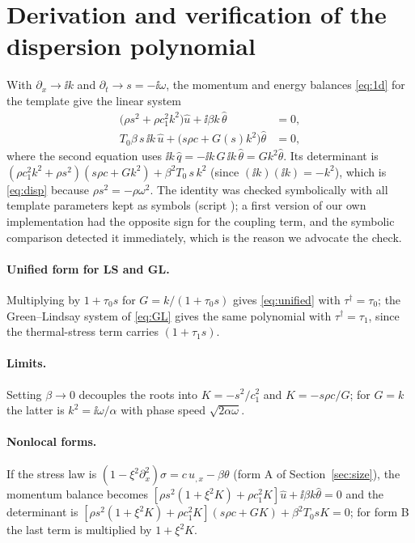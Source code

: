 \section{Derivation and verification of the dispersion polynomial}\label{app:disp}
With $\partial_x\to\ii k$ and $\partial_t\to s=-\ii\omega$, the momentum and energy balances \eqref{eq:1d} for the template give the linear system
\begin{align}
\bigl(\rho s^2+\rho c_1^2k^2\bigr)\hat u+\ii\beta k\,\hat\theta&=0,\\
T_0\beta\,s\,\ii k\,\hat u+\bigl(s\rho c+G(s)k^2\bigr)\hat\theta&=0,
\end{align}
where the second equation uses $\ii k\,\hat q=-\ii k\,G\,\ii k\,\hat\theta=Gk^2\hat\theta$. Its determinant is
$(\rho c_1^2k^2+\rho s^2)(s\rho c+Gk^2)+\beta^2T_0\,s\,k^2$ (since $(\ii k)(\ii k)=-k^2$), which is \eqref{eq:disp} because $\rho s^2=-\rho\omega^2$. The identity was checked symbolically with all template parameters kept as symbols (script ); a first version of our own implementation had the opposite sign for the coupling term, and the symbolic comparison detected it immediately, which is the reason we advocate the check.

\paragraph{Unified form for LS and GL.} Multiplying by $1+\tau_0s$ for $G=k/(1+\tau_0s)$ gives \eqref{eq:unified} with $\tau^\dagger=\tau_0$; the Green--Lindsay system of \eqref{eq:GL} gives the same polynomial with $\tau^\dagger=\tau_1$, since the thermal-stress term carries $(1+\tau_1s)$.

\paragraph{Limits.} Setting $\beta\to0$ decouples the roots into $K=-s^2/c_1^2$ and $K=-s\rho c/G$; for $G=k$ the latter is $k^2=\ii\omega/\alpha$ with phase speed $\sqrt{2\alpha\omega}$.

\paragraph{Nonlocal forms.} If the stress law is $(1-\xi^2\partial_x^2)\sigma=c\,u_{,x}-\beta\theta$ (form A of Section~\ref{sec:size}), the momentum balance becomes $[\rho s^2(1+\xi^2K)+\rho c_1^2K]\hat u+\ii\beta k\hat\theta=0$ and the determinant is $[\rho s^2(1+\xi^2K)+\rho c_1^2K](s\rho c+GK)+\beta^2T_0sK=0$; for form B the last term is multiplied by $1+\xi^2K$.
